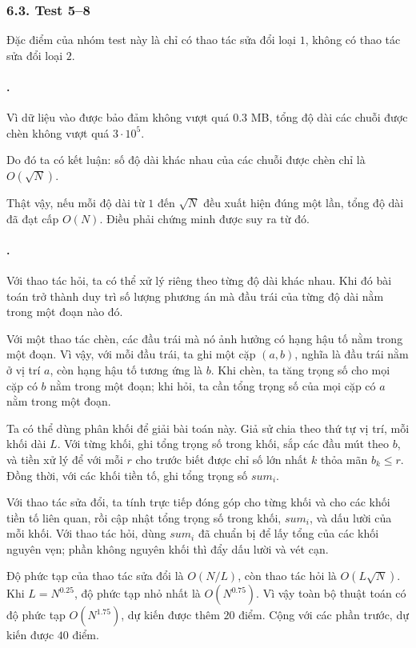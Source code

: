 \documentclass[11pt]{article}
\begin{document}
\subsubsection*{6.3. Test 5--8}

Đặc điểm của nhóm test này là chỉ có thao tác sửa đổi loại \(1\), không có
thao tác sửa đổi loại \(2\).

\paragraph{.}
Vì dữ liệu vào được bảo đảm không vượt quá \(0.3\) MB, tổng độ dài các chuỗi
được chèn không vượt quá \(3\cdot10^5\).

Do đó ta có kết luận: số độ dài khác nhau của các chuỗi được chèn chỉ là
\(O(\sqrt N)\).

Thật vậy, nếu mỗi độ dài từ \(1\) đến \(\sqrt N\) đều xuất hiện đúng một lần,
tổng độ dài đã đạt cấp \(O(N)\). Điều phải chứng minh được suy ra từ đó.

\paragraph{.}
Với thao tác hỏi, ta có thể xử lý riêng theo từng độ dài khác nhau. Khi đó bài
toán trở thành duy trì số lượng phương án mà đầu trái của từng độ dài nằm
trong một đoạn nào đó.

Với một thao tác chèn, các đầu trái mà nó ảnh hưởng có hạng hậu tố nằm trong
một đoạn. Vì vậy, với mỗi đầu trái, ta ghi một cặp \((a,b)\), nghĩa là đầu
trái nằm ở vị trí \(a\), còn hạng hậu tố tương ứng là \(b\). Khi chèn, ta tăng
trọng số cho mọi cặp có \(b\) nằm trong một đoạn; khi hỏi, ta cần tổng trọng
số của mọi cặp có \(a\) nằm trong một đoạn.

Ta có thể dùng phân khối để giải bài toán này. Giả sử chia theo thứ tự vị trí,
mỗi khối dài \(L\). Với từng khối, ghi tổng trọng số trong khối, sắp các đầu
mút theo \(b\), và tiền xử lý để với mỗi \(r\) cho trước biết được chỉ số lớn
nhất \(k\) thỏa mãn \(b_k\le r\). Đồng thời, với các khối tiền tố, ghi tổng
trọng số \(sum_i\).

Với thao tác sửa đổi, ta tính trực tiếp đóng góp cho từng khối và cho các khối
tiền tố liên quan, rồi cập nhật tổng trọng số trong khối, \(sum_i\), và dấu
lười của mỗi khối. Với thao tác hỏi, dùng \(sum_i\) đã chuẩn bị để lấy tổng
của các khối nguyên vẹn; phần không nguyên khối thì đẩy dấu lười và vét cạn.

Độ phức tạp của thao tác sửa đổi là \(O(N/L)\), còn thao tác hỏi là
\(O(L\sqrt N)\). Khi \(L=N^{0.25}\), độ phức tạp nhỏ nhất là \(O(N^{0.75})\).
Vì vậy toàn bộ thuật toán có độ phức tạp \(O(N^{1.75})\), dự kiến được thêm
\(20\) điểm. Cộng với các phần trước, dự kiến được \(40\) điểm.
\end{document}
